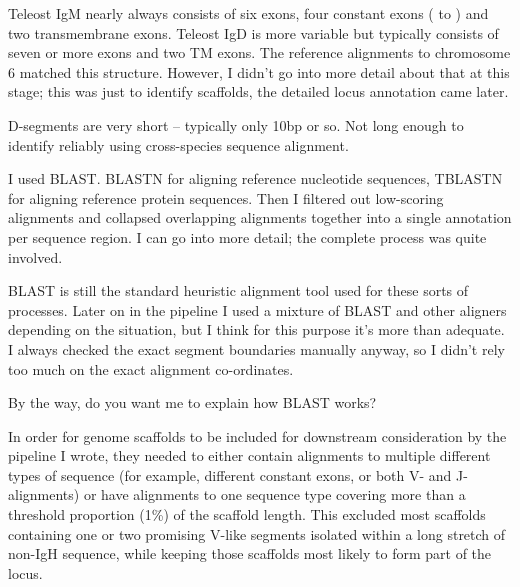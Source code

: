 Teleost IgM nearly always consists of six exons, four constant exons ( to ) and two transmembrane exons. Teleost IgD is more variable but typically consists of seven or more \cd{} exons and two TM exons. The reference alignments to chromosome 6 matched this structure. However, I didn't go into more detail about that at this stage; this was just to identify scaffolds, the detailed locus annotation came later.


D-segments are very short -- typically only 10bp or so. Not long enough to identify reliably using cross-species sequence alignment.


I used BLAST. BLASTN for aligning reference nucleotide sequences, TBLASTN for aligning reference protein sequences. Then I filtered out low-scoring alignments and collapsed overlapping alignments together into a single annotation per sequence region. I can go into more detail; the complete process was quite involved.


BLAST is still the standard heuristic alignment tool used for these sorts of processes. Later on in the pipeline I used a mixture of BLAST and other aligners depending on the situation, but I think for this purpose it's more than adequate. I always checked the exact segment boundaries manually anyway, so I didn't rely too much on the exact alignment co-ordinates.

By the way, do you want me to explain how BLAST works?


In order for genome scaffolds to be included for downstream consideration by the pipeline I wrote, they needed to either contain alignments to multiple different types of sequence (for example, different constant exons, or both V- and J-alignments) or have alignments to one sequence type covering more than a threshold proportion (1\%) of the scaffold length. This excluded most scaffolds containing one or two promising V-like segments isolated within a long stretch of non-IgH sequence, while keeping those scaffolds most likely to form part of the locus.

